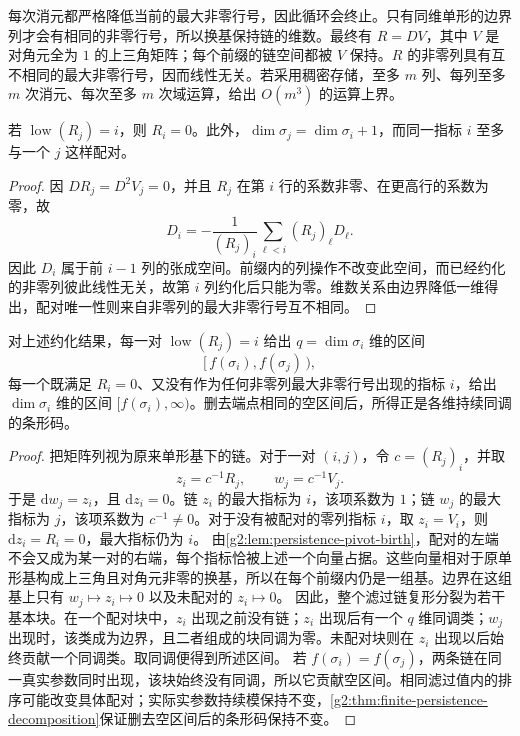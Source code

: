 每次消元都严格降低当前的最大非零行号，因此循环会终止。只有同维单形的边界列才会有相同的非零行号，所以换基保持链的维数。最终有 \(R=DV\)，其中 \(V\) 是对角元全为 \(1\) 的上三角矩阵；每个前缀的链空间都被 \(V\) 保持。\(R\) 的非零列具有互不相同的最大非零行号，因而线性无关。若采用稠密存储，至多 \(m\) 列、每列至多 \(m\) 次消元、每次至多 \(m\) 次域运算，给出 \(O(m^3)\) 的运算上界。

\begin{lemma}\label{g2:lem:persistence-pivot-birth}
	若 \(\operatorname{low}(R_j)=i\)，则 \(R_i=0\)。此外，\(\dim\sigma_j=\dim\sigma_i+1\)，而同一指标 \(i\) 至多与一个 \(j\) 这样配对。
\end{lemma}

\begin{proof}
	因 \(DR_j=D^2V_j=0\)，并且 \(R_j\) 在第 \(i\) 行的系数非零、在更高行的系数为零，故
	\[
		D_i=-\frac{1}{(R_j)_i}\sum_{\ell<i}(R_j)_\ell D_\ell.
	\]
	因此 \(D_i\) 属于前 \(i-1\) 列的张成空间。前缀内的列操作不改变此空间，而已经约化的非零列彼此线性无关，故第 \(i\) 列约化后只能为零。维数关系由边界降低一维得出，配对唯一性则来自非零列的最大非零行号互不相同。
\end{proof}

\begin{theorem}\label{g2:thm:persistence-reduction-barcode}
	对上述约化结果，每一对 \(\operatorname{low}(R_j)=i\) 给出 \(q=\dim\sigma_i\) 维的区间
	\[
		[\,f(\sigma_i),f(\sigma_j)\,),
	\]
	每一个既满足 \(R_i=0\)、又没有作为任何非零列最大非零行号出现的指标 \(i\)，给出 \(\dim\sigma_i\) 维的区间 \([f(\sigma_i),\infty)\)。删去端点相同的空区间后，所得正是各维持续同调的条形码。
\end{theorem}

\begin{proof}
	把矩阵列视为原来单形基下的链。对于一对 \((i,j)\)，令 \(c=(R_j)_i\)，并取
	\[
		z_i=c^{-1}R_j,\qquad w_j=c^{-1}V_j.
	\]
	于是 \(\mathrm d w_j=z_i\)，且 \(\mathrm d z_i=0\)。链 \(z_i\) 的最大指标为 \(i\)，该项系数为 \(1\)；链 \(w_j\) 的最大指标为 \(j\)，该项系数为 \(c^{-1}\neq0\)。对于没有被配对的零列指标 \(i\)，取 \(z_i=V_i\)，则 \(\mathrm d z_i=R_i=0\)，最大指标仍为 \(i\)。
	\ProseParagraphBreak
	由\cref{g2:lem:persistence-pivot-birth}，配对的左端不会又成为某一对的右端，每个指标恰被上述一个向量占据。这些向量相对于原单形基构成上三角且对角元非零的换基，所以在每个前缀内仍是一组基。边界在这组基上只有 \(w_j\mapsto z_i\mapsto0\) 以及未配对的 \(z_i\mapsto0\)。
	\ProseParagraphBreak
	因此，整个滤过链复形分裂为若干基本块。在一个配对块中，\(z_i\) 出现之前没有链；\(z_i\) 出现后有一个 \(q\) 维同调类；\(w_j\) 出现时，该类成为边界，且二者组成的块同调为零。未配对块则在 \(z_i\) 出现以后始终贡献一个同调类。取同调便得到所述区间。
	\ProseParagraphBreak
	若 \(f(\sigma_i)=f(\sigma_j)\)，两条链在同一真实参数同时出现，该块始终没有同调，所以它贡献空区间。相同滤过值内的排序可能改变具体配对；实际实参数持续模保持不变，\cref{g2:thm:finite-persistence-decomposition}保证删去空区间后的条形码保持不变。
\end{proof}

